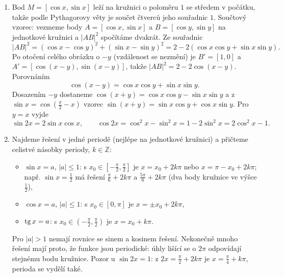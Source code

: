 \begin{enumerate}[label=\textbf{\arabic*.}, leftmargin=*, itemsep=0.8em]
  \item {}
  Bod $M = [\cos x, \sin x]$ leží na kružnici o poloměru $1$ se středem v počátku, takže podle Pythagorovy věty je součet čtverců jeho souřadnic $1$. Součtový vzorec: vezmeme body $A = [\cos x, \sin x]$ a $B = [\cos y, \sin y]$ na jednotkové kružnici a $|AB|^2$ spočítáme dvakrát. Ze souřadnic
  \begin{equation*}
    |AB|^2 = {(\cos x - \cos y)}^2 + {(\sin x - \sin y)}^2 = 2 - 2(\cos x\cos y + \sin x\sin y).
  \end{equation*}
  Po otočení celého obrázku o $-y$ (vzdálenost se nezmění) je $B' = [1, 0]$ a $A' = [\cos(x - y), \sin(x - y)]$, takže $|AB|^2 = 2 - 2\cos(x - y)$. Porovnáním
  \begin{equation*}
    \cos(x - y) = \cos x\cos y + \sin x\sin y.
  \end{equation*}
  Dosazením $-y$ dostaneme $\cos(x + y) = \cos x\cos y - \sin x\sin y$ a z $\sin x = \cos\left(\frac{\pi}{2} - x\right)$ vzorec $\sin(x + y) = \sin x\cos y + \cos x\sin y$. Pro $y = x$ vyjde
  \begin{equation*}
    \sin 2x = 2\sin x\cos x, \qquad \cos 2x = \cos^2 x - \sin^2 x = 1 - 2\sin^2 x = 2\cos^2 x - 1.
  \end{equation*}

  \item {}
  Najdeme řešení v jedné periodě (nejlépe na jednotkové kružnici) a přičteme celistvé násobky periody, $k\in\mathbb{Z}$:
  \begin{itemize}
    \item $\sin x = a$, $|a|\leq 1$: s $x_0\in\left[-\frac{\pi}{2}, \frac{\pi}{2}\right]$ je $x = x_0 + 2k\pi$ nebo $x = \pi - x_0 + 2k\pi$; např. $\sin x = \frac{1}{2}$ má řešení $\frac{\pi}{6} + 2k\pi$ a $\frac{5\pi}{6} + 2k\pi$ (dva body kružnice ve výšce $\frac{1}{2}$),
    \item $\cos x = a$, $|a|\leq 1$: s $x_0\in[0, \pi]$ je $x = \pm x_0 + 2k\pi$,
    \item $\operatorname{tg} x = a$: s $x_0\in\left(-\frac{\pi}{2}, \frac{\pi}{2}\right)$ je $x = x_0 + k\pi$.
  \end{itemize}
  Pro $|a| > 1$ nemají rovnice se sinem a kosinem řešení. Nekonečně mnoho řešení mají proto, že funkce jsou periodické: úhly lišící se o $2\pi$ odpovídají stejnému bodu kružnice. Pozor u $\sin 2x = 1$: z $2x = \frac{\pi}{2} + 2k\pi$ je $x = \frac{\pi}{4} + k\pi$, perioda se vydělí také. 


\end{enumerate}
